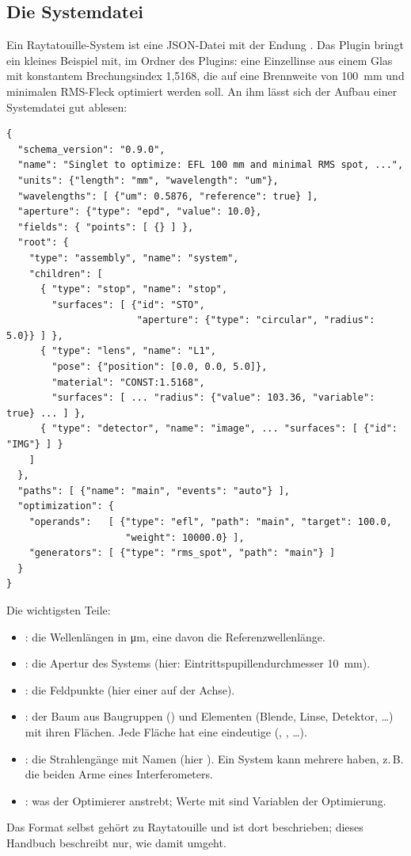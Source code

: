 \subsection{Die Systemdatei}

Ein Raytatouille-System ist eine JSON-Datei mit der Endung . Das Plugin
bringt ein kleines Beispiel mit,  im Ordner des Plugins:
eine Einzellinse aus einem Glas mit konstantem Brechungsindex 1{,}5168, die auf eine Brennweite
von \SI{100}{\milli\metre} und minimalen RMS-Fleck optimiert werden soll. An ihm lässt sich der
Aufbau einer Systemdatei gut ablesen:

\begin{lstlisting}
{
  "schema_version": "0.9.0",
  "name": "Singlet to optimize: EFL 100 mm and minimal RMS spot, ...",
  "units": {"length": "mm", "wavelength": "um"},
  "wavelengths": [ {"um": 0.5876, "reference": true} ],
  "aperture": {"type": "epd", "value": 10.0},
  "fields": { "points": [ {} ] },
  "root": {
    "type": "assembly", "name": "system",
    "children": [
      { "type": "stop", "name": "stop",
        "surfaces": [ {"id": "STO",
                       "aperture": {"type": "circular", "radius": 5.0}} ] },
      { "type": "lens", "name": "L1",
        "pose": {"position": [0.0, 0.0, 5.0]},
        "material": "CONST:1.5168",
        "surfaces": [ ... "radius": {"value": 103.36, "variable": true} ... ] },
      { "type": "detector", "name": "image", ... "surfaces": [ {"id": "IMG"} ] }
    ]
  },
  "paths": [ {"name": "main", "events": "auto"} ],
  "optimization": {
    "operands":   [ {"type": "efl", "path": "main", "target": 100.0,
                     "weight": 10000.0} ],
    "generators": [ {"type": "rms_spot", "path": "main"} ]
  }
}
\end{lstlisting}

Die wichtigsten Teile:
\begin{itemize}
  \item {}: die Wellenlängen in \si{\micro\metre}, eine davon die
    Referenzwellenlänge.
  \item {}: die Apertur des Systems (hier: Eintrittspupillendurchmesser
    \SI{10}{\milli\metre}).
  \item {}: die Feldpunkte (hier einer auf der Achse).
  \item {}: der Baum aus Baugruppen () und Elementen (Blende, Linse,
    Detektor, \dots) mit ihren Flächen. Jede Fläche hat eine eindeutige 
    (, , \dots).
  \item {}: die Strahlengänge mit Namen (hier ). Ein System kann mehrere
    haben, z.\,B. die beiden Arme eines Interferometers.
  \item {}: was der Optimierer anstrebt; Werte mit
     sind Variablen der Optimierung.
\end{itemize}
Das Format selbst gehört zu Raytatouille und ist dort beschrieben; dieses Handbuch beschreibt
nur, wie \produkt{} damit umgeht.

